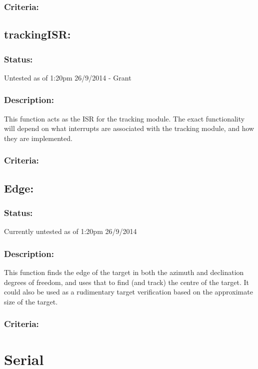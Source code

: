 \documentclass[]{article}
\begin{document}
\subsubsection{Criteria:}

\subsection{trackingISR:}
\subsubsection{Status:}
Untested as of 1:20pm 26/9/2014 - Grant

\subsubsection{Description:}
This function acts as the ISR for the tracking module. The exact functionality will depend on what interrupts are associated with the tracking module, and how they are implemented.

\subsubsection{Criteria:}


\subsection{Edge:}
\subsubsection{Status:}
Currently untested as of 1:20pm 26/9/2014

\subsubsection{Description:}
This function finds the edge of the target in both the azimuth and declination degrees of freedom, and uses that to find (and track) the centre of the target. It could also be used as a rudimentary target verification based on the approximate size of the target.

\subsubsection{Criteria:}

\newpage
\section{Serial}
\end{document}
